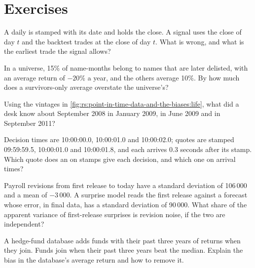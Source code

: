 \section{Exercises}

\begin{exercise}[$\star$]\label{exo:rs:point-in-time-data-and-the-biases:1}
A daily  is stamped with its date and holds the close. A signal uses the close of day $t$ and the backtest trades at the close
of day $t$. What is wrong, and what is the earliest trade the signal allows?
\end{exercise}

\begin{exercise}[$\star$]\label{exo:rs:point-in-time-data-and-the-biases:2}
In a universe, 15\% of name-months belong to names that are later delisted, with an average return of $-20\%$ a year, and the
others average 10\%. By how much does a survivors-only average overstate the universe's?
\end{exercise}

\begin{exercise}[$\star$]\label{exo:rs:point-in-time-data-and-the-biases:3}
Using the vintages in \cref{fig:rs:point-in-time-data-and-the-biases:life}, what did a desk know about September 2008 in
January 2009, in June 2009 and in September 2011?
\end{exercise}

\begin{exercise}[$\star\star$]\label{exo:rs:point-in-time-data-and-the-biases:4}
Decision times are 10:00:00.0, 10:00:01.0 and 10:00:02.0; quotes are stamped 09:59:59.5, 10:00:01.0 and 10:00:01.8, and each
arrives 0.3 seconds after its stamp. Which quote does an  on stamps give each decision, and which one on arrival
times?
\end{exercise}

\begin{exercise}[$\star\star$]\label{exo:rs:point-in-time-data-and-the-biases:5}
Payroll revisions from first release to today have a standard deviation of 106\,000 and a mean of $-3\,000$. A surprise model
reads the first release against a forecast whose error, in final data, has a standard deviation of 90\,000. What share of the
apparent variance of first-release surprises is revision noise, if the two are independent?
\end{exercise}

\begin{exercise}[$\star\star$]\label{exo:rs:point-in-time-data-and-the-biases:6}
A hedge-fund database adds funds with their past three years of returns when they join. Funds join when their past three years
beat the median. Explain the bias in the database's average return and how to remove it.
\end{exercise}

